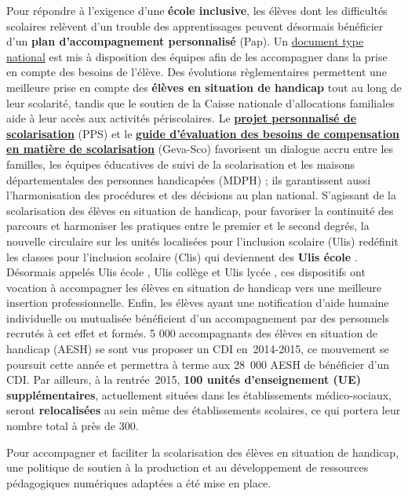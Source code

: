 Pour répondre à l’exigence d’une \textbf{école inclusive}, les élèves dont les difficultés scolaires relèvent d’un trouble des apprentissages peuvent désormais bénéficier d’un \textbf{plan d’accompagnement personnalisé} (Pap). Un \href{http://cache.media.education.gouv.fr/file/5/50/4/ensel1296_annexe_plan_daccompagnement_personnalise_386504.pdf}{document type national} est mis à disposition des équipes afin de les accompagner dans la prise en compte des besoins de l’élève. Des évolutions règlementaires permettent une meilleure prise en compte des \textbf{élèves en situation de handicap} tout au long de leur scolarité, tandis que le soutien de la Caisse nationale d’allocations familiales aide à leur accès aux activités périscolaires. Le \textbf{\href{http://www.education.gouv.fr/pid25535/bulletin_officiel.html&cid_bo=86108}{projet personnalisé de scolarisation}} (PPS) et le \href{http://www.education.gouv.fr/pid25535/bulletin_officiel.html&cid_bo=86110}{\textbf{guide d’évaluation des besoins de compensation en matière de scolarisation}} (Geva-Sco) favorisent un dialogue accru entre les familles, les équipes éducatives de suivi de la scolarisation et les maisons départementales des personnes handicapées (MDPH) ; ils garantissent aussi l’harmonisation des procédures et des décisions au plan national. S’agissant de la scolarisation des élèves en situation de handicap, pour favoriser la continuité des parcours et harmoniser les pratiques entre le premier et le second degrés, la nouvelle circulaire sur les unités localisées pour l’inclusion scolaire (Ulis) redéfinit les classes pour l’inclusion scolaire (Clis) qui deviennent des \textbf{\og Ulis école \fg{}}. Désormais appelés \og Ulis école \fg{}, \og Ulis collège \fg{} et \og Ulis lycée \fg{}, ces dispositifs ont vocation à accompagner les élèves en situation de handicap vers une meilleure insertion professionnelle. Enfin, les élèves ayant une notification d’aide humaine individuelle ou mutualisée bénéficient d’un accompagnement par des personnels recrutés à cet effet et formés. 5 000 accompagnants des élèves en situation de handicap (AESH) se sont vus proposer un CDI en~2014-2015, ce mouvement se poursuit cette année et permettra à terme aux 28~000 AESH de bénéficier d’un CDI. Par ailleurs, à la rentrée~2015, \textbf{100 unités d’enseignement (UE) supplémentaires}, actuellement situées dans les établissements médico-sociaux, seront \textbf{relocalisées} au sein même des établissements scolaires, ce qui portera leur nombre total à près de 300.

Pour accompagner et faciliter la scolarisation des élèves en situation de handicap, une politique de soutien à la production et au développement de ressources pédagogiques numériques adaptées a été mise en place.

